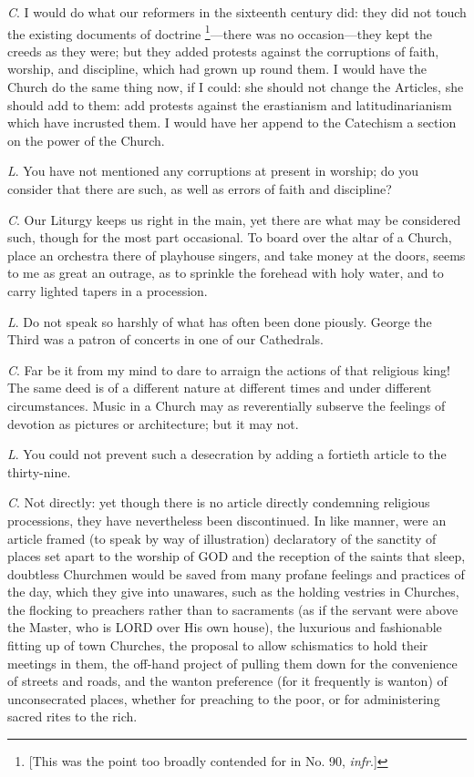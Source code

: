 \emph{C}. I would do what our reformers in the
sixteenth century did: they did not touch the existing documents of
doctrine \footnote{[This was the point too broadly contended for in No. 90, \emph{infr}.]}—there was no
occasion—they kept the creeds as they were; but they added protests
against the corruptions of faith, worship, and discipline, which had
grown up round them. I would have the Church do the same thing now, if
I could: she should not change the Articles, she should add to them:
add protests against the erastianism and latitudinarianism which have
incrusted them. I would have her append to the Catechism a section on
the power of the Church.

\emph{L}. You have not mentioned any corruptions
at present in worship; do you consider that there are such, as well as
errors of faith and discipline?

\emph{C}. Our Liturgy keeps us right in the main,
yet there are what may be considered such, though for the most part occasional. To board over the altar of a Church, place an
orchestra there of playhouse singers, and take money at the doors,
seems to me as great an outrage, as to sprinkle the forehead with holy
water, and to carry lighted tapers in a procession.

\emph{L}. Do not speak so harshly of what has
often been done piously. George the Third was a patron of concerts in
one of our Cathedrals.

\emph{C}. Far be it from my mind to dare to
arraign the actions of that religious king! The same deed is of a
different nature at different times and under different circumstances.
Music in a Church may as reverentially subserve the feelings of
devotion as pictures or architecture; but it may not.

\emph{L}. You could not prevent such a
desecration by adding a fortieth article to the thirty-nine.

\emph{C}. Not directly: yet though there is no
article directly condemning religious processions, they have
nevertheless been discontinued. In like manner, were an article framed
(to speak by way of illustration) declaratory of the sanctity of
places set apart to the worship of GOD
and the reception of the saints that sleep, doubtless Churchmen would
be saved from many profane feelings and practices of the day, which
they give into unawares, such as the holding vestries in Churches, the
flocking to preachers rather than to sacraments (as if the servant
were above the Master, who is LORD
over His own house), the luxurious and fashionable fitting up of town
Churches, the proposal to allow schismatics to hold their meetings in
them, the off-hand project of pulling them down for the convenience of
streets and roads, and the wanton preference (for it frequently is
wanton) of unconsecrated places, whether for preaching to the poor, or
for administering sacred rites to the rich.

